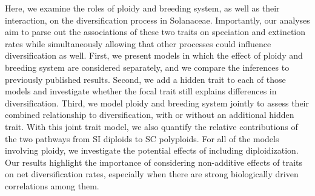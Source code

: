 Here, we examine the roles of ploidy and breeding system, as well as their interaction, on the diversification process in Solanaceae.
Importantly, our analyses aim to parse out the associations of these two traits on speciation and extinction rates while simultaneously allowing that other processes could influence diversification as well.
First, we present models in which the effect of ploidy and breeding system are considered separately, and we compare the inferences to previously published results. 
Second, we add a hidden trait to each of those models and investigate whether the focal trait still explains differences in diversification.
Third, we model ploidy and breeding system jointly to assess their combined relationship to diversification, with or without an additional hidden trait.
With this joint trait model, we also quantify the relative contributions of the two pathways from SI diploids to SC polyploids.
For all of the models involving ploidy, we investigate the potential effects of including diploidization.
Our results highlight the importance of considering non-additive effects of traits on net diversification rates, especially when there are strong biologically driven correlations among them.
